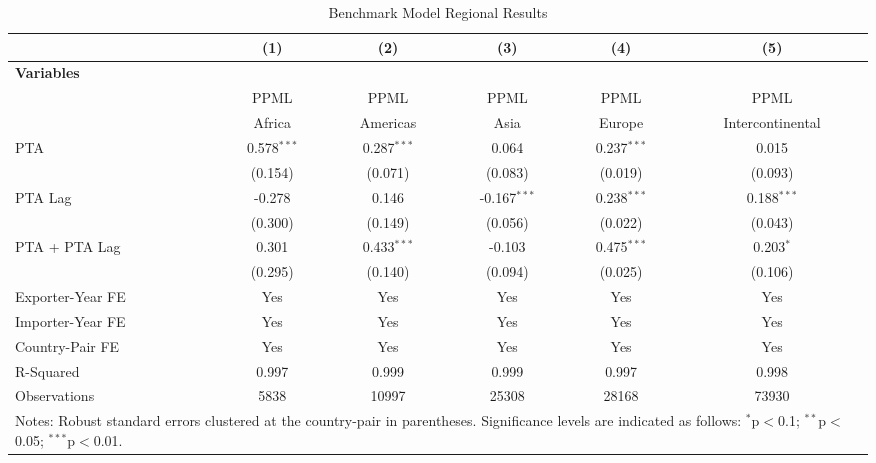 \begin{table}[htbp]
    \centering
    \caption{Benchmark Model Regional Results}
    \label{tab:benchmark_region_analysis} %
    \begin{adjustbox}{max width=\textwidth}
    \begin{tabular}{l@{\extracolsep{1pt}}ccccc}
    \hline
    & \multicolumn{1}{c}{(1)} & \multicolumn{1}{c}{(2)} & \multicolumn{1}{c}{(3)} & \multicolumn{1}{c}{(4)} & \multicolumn{1}{c}{(5)} \\
    \hline
    \textbf{Variables} &  &  &  &  &  \\
    \hline
     & PPML & PPML & PPML & PPML & PPML \\
     & Africa & Americas & Asia & Europe & Intercontinental \\
    \hline
    PTA & 0.578$^{\ast\ast\ast}$ & 0.287$^{\ast\ast\ast}$ & 0.064 & 0.237$^{\ast\ast\ast}$ & 0.015 \\
    & (0.154) & (0.071) & (0.083) & (0.019) & (0.093) \\

    PTA Lag & -0.278 & 0.146 & -0.167$^{\ast\ast\ast}$ & 0.238$^{\ast\ast\ast}$ & 0.188$^{\ast\ast\ast}$ \\
    & (0.300) & (0.149) & (0.056) & (0.022) & (0.043) \\

    PTA + PTA Lag & 0.301 & 0.433$^{\ast\ast\ast}$ & -0.103 & 0.475$^{\ast\ast\ast}$ & 0.203$^{\ast}$ \\
    & (0.295) & (0.140) & (0.094) & (0.025) & (0.106) \\
    \hline
    Exporter-Year FE & Yes & Yes & Yes & Yes & Yes \\
    Importer-Year FE & Yes & Yes & Yes & Yes & Yes \\
    Country-Pair FE & Yes & Yes & Yes & Yes & Yes \\
    R-Squared & 0.997 & 0.999 & 0.999 & 0.997 & 0.998 \\
    Observations & 5838 & 10997 & 25308 & 28168 & 73930 \\
    \hline
    \multicolumn{6}{l}{\footnotesize{Notes: Robust standard errors clustered at the country-pair in parentheses. Significance levels are indicated as follows: $^{\ast}$p$<$0.1; $^{\ast\ast}$p$<$0.05; $^{\ast\ast\ast}$p$<$0.01.}} \\
    \end{tabular}
    \end{adjustbox}
\end{table}    